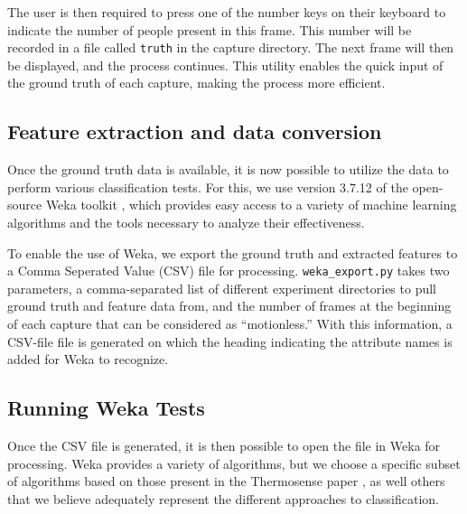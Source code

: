 \documentclass[../thesis/thesis.tex]{subfiles}
\begin{document}
The user is then required to press one of the number keys on their keyboard to indicate the number of people present in this frame. This number will be recorded in a file called \texttt{truth} in the capture directory. The next frame will then be displayed, and the process continues. This utility enables the quick input of the ground truth of each capture, making the process more efficient.

\subsection{Feature extraction and data conversion}

Once the ground truth data is available, it is now possible to utilize the data to perform various classification tests. For this, we use version 3.7.12 of the open-source Weka toolkit \cite{Weka}, which provides easy access to a variety of machine learning algorithms and the tools necessary to analyze their effectiveness.

To enable the use of Weka, we export the ground truth and extracted features to a Comma Seperated Value (CSV) file for processing. \texttt{weka\_export.py} takes two parameters, a comma-separated list of different experiment directories to pull ground truth and feature data from, and the number of frames at the beginning of each capture that can be considered as ``motionless.'' With this information, a CSV-file file is generated on which the heading indicating the attribute names is added for Weka to recognize.

\subsection{Running Weka Tests}
Once the CSV file is generated, it is then possible to open the file in Weka for processing. Weka provides a variety of algorithms, but we choose a specific subset of algorithms based on those present in the Thermosense paper \cite{beltran2013thermosense}, as well others that we believe adequately represent the different approaches to classification.
\end{document}
